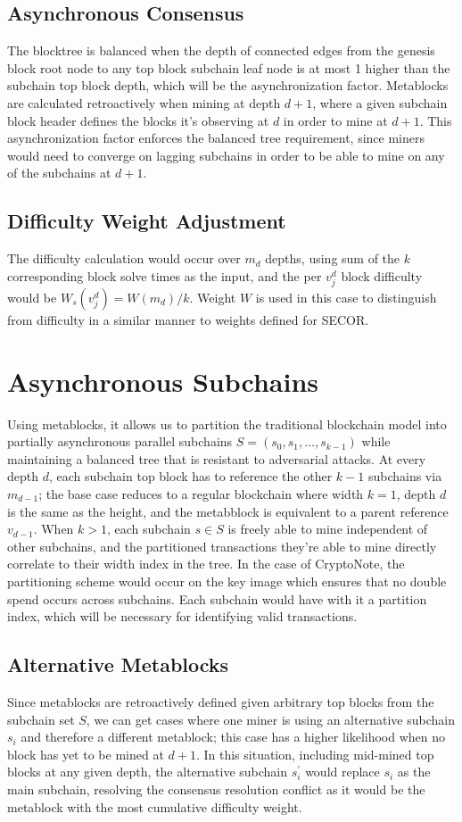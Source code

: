 \documentclass{article}
\begin{document}
\subsection{Asynchronous Consensus}
The blocktree is balanced when the depth of connected edges from the genesis block root node to any top block subchain leaf node is at most 1 higher than the subchain top block depth, which will be the asynchronization factor. Metablocks are calculated retroactively when mining at depth $d+1$, where a given subchain block header defines the blocks it's observing at $d$ in order to mine at $d+1$. This asynchronization factor enforces the balanced tree requirement, since miners would need to converge on lagging subchains in order to be able to mine on any of the subchains at $d+1$.
\subsection{Difficulty Weight Adjustment}
The difficulty calculation would occur over $m_d$ depths, using sum of the $k$ corresponding block solve times as the input, and the per $v_j^d$ block difficulty would be $W_s(v_j^d) = W(m_d) / k$. Weight $W$ is used in this case to distinguish from difficulty in a similar manner to weights defined for SECOR\cite{khawaja}.
\section{Asynchronous Subchains}
Using metablocks, it allows us to partition the traditional blockchain model into partially asynchronous parallel subchains $S = (s_0, s_1, \ldots, s_{k-1})$ while maintaining a balanced tree that is resistant to adversarial attacks. At every depth $d$, each subchain top block has to reference the other $k-1$ subchains via $m_{d-1}$; the base case reduces to a regular blockchain where width $k = 1$, depth $d$ is the same as the height, and the metabblock is equivalent to a parent reference $v_{d-1}$. When $k > 1$, each subchain $s \in S$ is freely able to mine independent of other subchains, and the partitioned transactions they're able to mine directly correlate to their width index in the tree. In the case of CryptoNote\cite{saberhagen}, the partitioning scheme would occur on the key image which ensures that no double spend occurs across subchains. Each subchain would have with it a partition index, which will be necessary for identifying valid transactions.
\subsection{Alternative Metablocks}
Since metablocks are retroactively defined given arbitrary top blocks from the subchain set $S$, we can get cases where one miner is using an alternative subchain $s_i$ and therefore a different metablock; this case has a higher likelihood when no block has yet to be mined at $d+1$. In this situation, including mid-mined top blocks at any given depth, the alternative subchain $s_i^\prime$ would replace $s_i$ as the main subchain, resolving the consensus resolution conflict as it would be the metablock with the most cumulative difficulty weight.
\end{document}
